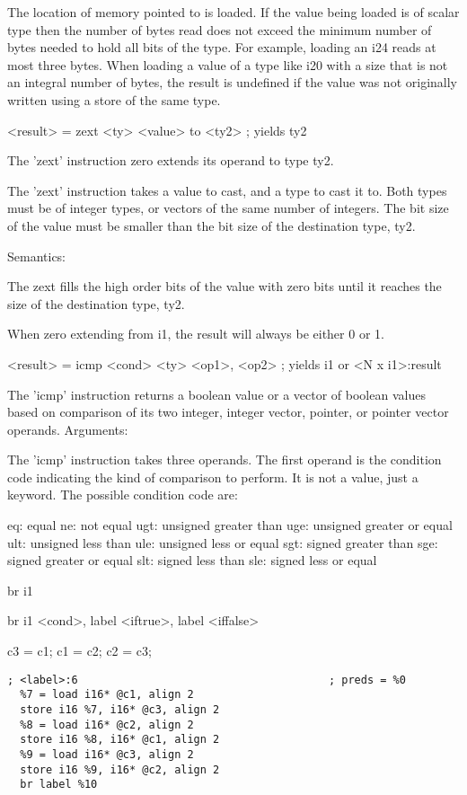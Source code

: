 \begin{lstlistings}
The location of memory pointed to is loaded. If the value being loaded is of scalar type then the number of bytes read does not exceed the minimum number of bytes needed to hold all bits of the type. For example, loading an i24 reads at most three bytes. When loading a value of a type like i20 with a size that is not an integral number of bytes, the result is undefined if the value was not originally written using a store of the same type.

  <result> = zext <ty> <value> to <ty2>             ; yields ty2

The 'zext' instruction zero extends its operand to type ty2.

The 'zext' instruction takes a value to cast, and a type to cast it to. Both types must be of integer types, or vectors of the same number of integers. The bit size of the value must be smaller than the bit size of the destination type, ty2.

Semantics:

The zext fills the high order bits of the value with zero bits until it reaches the size of the destination type, ty2.

When zero extending from i1, the result will always be either 0 or 1.

  <result> = icmp <cond> <ty> <op1>, <op2>   ; yields {i1} or {<N x i1>}:result

The 'icmp' instruction returns a boolean value or a vector of boolean values based on comparison of its two integer, integer vector, pointer, or pointer vector operands.
Arguments:

The 'icmp' instruction takes three operands. The first operand is the condition code indicating the kind of comparison to perform. It is not a value, just a keyword. The possible condition code are:

    eq: equal
    ne: not equal
    ugt: unsigned greater than
    uge: unsigned greater or equal
    ult: unsigned less than
    ule: unsigned less or equal
    sgt: signed greater than
    sge: signed greater or equal
    slt: signed less than
    sle: signed less or equal

  br i1 %

  br i1 <cond>, label <iftrue>, label <iffalse>

\begin{lstlistings}
    c3 = c1;
    c1 = c2;
    c2 = c3;
\end{lstlistings}

\begin{verbatim}
; <label>:6                                       ; preds = %0
  %7 = load i16* @c1, align 2
  store i16 %7, i16* @c3, align 2
  %8 = load i16* @c2, align 2
  store i16 %8, i16* @c1, align 2
  %9 = load i16* @c3, align 2
  store i16 %9, i16* @c2, align 2
  br label %10
\end{verbatim}


\end{lstlistings}
